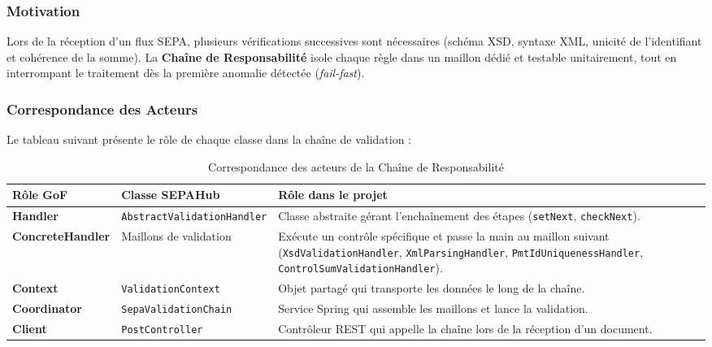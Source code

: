 \documentclass[12pt,a4paper]{article}
\begin{document}
\subsubsection{Motivation}
Lors de la réception d'un flux SEPA, plusieurs vérifications successives sont nécessaires (schéma XSD, syntaxe XML, unicité de l'identifiant et cohérence de la somme). La \textbf{Chaîne de Responsabilité} isole chaque règle dans un maillon dédié et testable unitairement, tout en interrompant le traitement dès la première anomalie détectée (\textit{fail-fast}).

\subsubsection{Correspondance des Acteurs}
Le tableau suivant présente le rôle de chaque classe dans la chaîne de validation :

\begin{table}[H]
    \centering
    \small
    \begin{tabularx}{\textwidth}{|l|p{4.5cm}|Y|}
        \hline
        \textbf{Rôle GoF} & \textbf{Classe SEPAHub} & \textbf{Rôle dans le projet} \\
        \hline
        \textbf{Handler} & \texttt{AbstractValidationHandler} & Classe abstraite gérant l'enchaînement des étapes (\texttt{setNext}, \allowbreak\texttt{checkNext}). \\
        \hline
        \textbf{ConcreteHandler} & Maillons de validation & Exécute un contrôle spécifique et passe la main au maillon suivant (\texttt{XsdValidationHandler}, \allowbreak\texttt{XmlParsingHandler}, \allowbreak\texttt{PmtIdUniquenessHandler}, \allowbreak\texttt{ControlSumValidationHandler}). \\
        \hline
        \textbf{Context} & \texttt{ValidationContext} & Objet partagé qui transporte les données le long de la chaîne. \\
        \hline
        \textbf{Coordinator} & \texttt{SepaValidationChain} & Service Spring qui assemble les maillons et lance la validation. \\
        \hline
        \textbf{Client} & \texttt{PostController} & Contrôleur REST qui appelle la chaîne lors de la réception d'un document. \\
        \hline
    \end{tabularx}
    \caption{Correspondance des acteurs de la Chaîne de Responsabilité}
\end{table}

\clearpage
\end{document}
